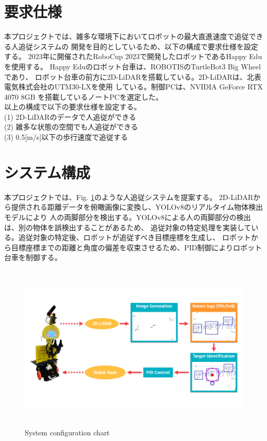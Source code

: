 \section{要求仕様}
本プロジェクトでは、雑多な環境下においてロボットの最大直進速度で追従できる人追従システムの
開発を目的としているため、以下の構成で要求仕様を設定する。
2023年に開催されたRoboCup 2023で開発したロボットであるHappy Eduを使用する。
Happy Eduのロボット台車は、ROBOTISのTurtleBot3 Big Wheelであり、
ロボット台車の前方に2D-LiDARを搭載している。2D-LiDARは、北表電気株式会社のUTM30-LXを使用
している。制御PCは、NVIDIA GeForce RTX 4070 8GB を搭載しているノートPCを選定した。\\ \indent
以上の構成で以下の要求仕様を設定する。\\
(1) 2D-LiDARのデータで人追従ができる \\
(2) 雑多な状態の空間でも人追従ができる \\
(3) 0.5[m/s]以下の歩行速度で追従する \\

\section{システム構成}
本プロジェクトでは、Fig. \ref{System configuration chart}のような人追従システムを提案する。
2D-LiDARから提供される距離データを俯瞰画像に変換し、YOLOv8のリアルタイム物体検出モデルにより
人の両脚部分を検出する。YOLOv8による人の両脚部分の検出は、別の物体を誤検出することがあるため、
追従対象の特定処理を実装している。追従対象の特定後、ロボットが追従すべき目標座標を生成し、
ロボットから目標座標までの距離と角度の偏差を収束させるため、PID制御によりロボット台車を制御する。

\begin{figure}[h]
    \begin{center}
    \includegraphics[height=80mm,clip]{figure/System-configration-chart.png}
    \caption{System configuration chart}
    \label{System configuration chart}
    \end{center}
\end{figure}

